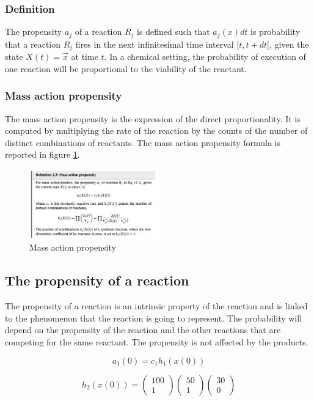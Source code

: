     \subsubsection{Definition}
    The propensity $a_j$ of a reaction $R_j$ is defined such that $a_j(x)dt$ is probability that a reaction $R_j$ fires in the next infinitesimal time interval $[t, t+dt[$, given the state $X(t) = \vec{x}$ at time $t$.
  In a chemical setting, the probability of execution of one reaction will be proportional to the viability of the reactant.

    \subsubsection{Mass action propensity}
    The mass action propensity is the expression of the direct proportionality.
    It is computed by multiplying the rate of the reaction by the counts of the number of distinct combinations of reactants.
    The mass action propensity formula is reported in figure \ref{fig:massaction}.

    \begin{figure}[H]
       \centering
       \includegraphics[width=0.5\textwidth]{massaction.png}
       \caption{Mass action propensity}
       \label{fig:massaction}
    \end{figure}

  \subsection{The propensity of a reaction}
  The propensity of a reaction is an intrinsic property of the reaction and is linked to the phenomenon that the reaction is going to represent.
  The probability will depend on the propensity of the reaction and the other reactions that are competing for the same reactant.
  The propensity is not affected by the products.

  $$a_1 (0) = c_1 h_1 (x(0))$$

  $$h_2(x(0)) = \begin{pmatrix}100 \\ 1 \end{pmatrix}\begin{pmatrix}50 \\ 1 \end{pmatrix}\begin{pmatrix}30 \\ 0 \end{pmatrix}$$

